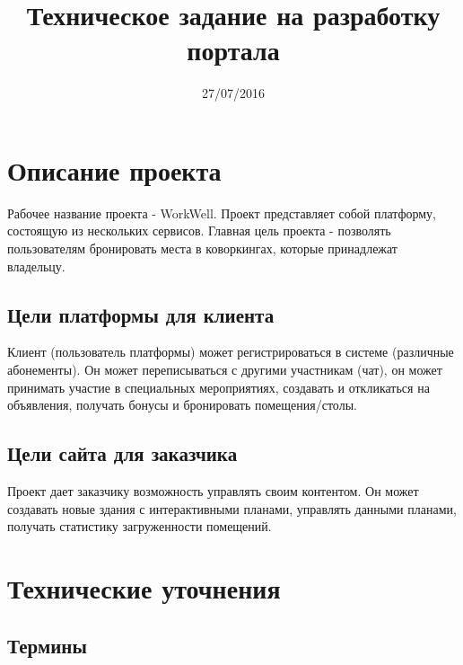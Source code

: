 \documentclass[DIV=calc, paper=a4, fontsize=11pt]{scrartcl} %
\title{Техническое задание на разработку портала}
\date{27/07/2016}
\newcommand{\ProjectTitle}{WorkWell}
\begin{document}
\maketitle

\section{Описание проекта}
Рабочее название проекта - \ProjectTitle . Проект представляет собой платформу, состоящую из нескольких сервисов. Главная цель проекта - позволять пользователям бронировать места в коворкингах, которые принадлежат владельцу.

\subsection{Цели платформы для клиента}
Клиент (пользователь платформы) может регистрироваться в системе (различные абонементы). Он может переписываться с другими участникам (чат), он может принимать участие в специальных мероприятиях, создавать и откликаться на объявления, получать бонусы и бронировать помещения/столы.

\subsection{Цели сайта для заказчика}
Проект дает заказчику возможность управлять своим контентом. Он может создавать новые здания с интерактивными планами, управлять данными планами, получать статистику загруженности помещений.

\section{Технические уточнения}

\subsection{Термины}
\end{document}
